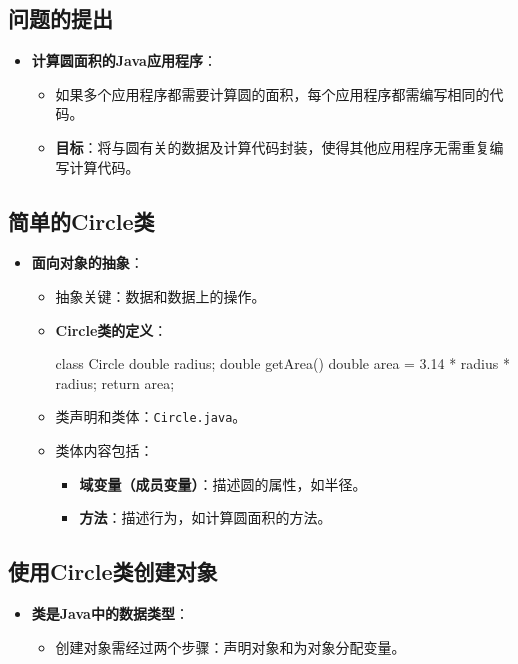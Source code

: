 \documentclass[a4paper, 10pt]{ctexart}
\begin{document}
\subsection{问题的提出}
\begin{itemize}
  \item \textbf{计算圆面积的Java应用程序}：
  \begin{itemize}
    \item 如果多个应用程序都需要计算圆的面积，每个应用程序都需编写相同的代码。
    \item \textbf{目标}：将与圆有关的数据及计算代码封装，使得其他应用程序无需重复编写计算代码。
  \end{itemize}
\end{itemize}

\subsection{简单的Circle类}
\begin{itemize}
  \item \textbf{面向对象的抽象}：
  \begin{itemize}
    \item 抽象关键：数据和数据上的操作。
    \item \textbf{Circle类的定义}：
    \begin{codeblock}
class Circle {
    double radius;
    double getArea() {
        double area = 3.14 * radius * radius;
        return area;
    }
}
    \end{codeblock}
    \item 类声明和类体：\texttt{Circle.java}。
    \item 类体内容包括：
    \begin{itemize}
      \item \textbf{域变量（成员变量）}：描述圆的属性，如半径。
      \item \textbf{方法}：描述行为，如计算圆面积的方法。
    \end{itemize}
  \end{itemize}
\end{itemize}

\subsection{使用Circle类创建对象}
\begin{itemize}
  \item \textbf{类是Java中的数据类型}：
  \begin{itemize}
    \item 创建对象需经过两个步骤：声明对象和为对象分配变量。
  \end{itemize}
\end{itemize}
\end{document}
